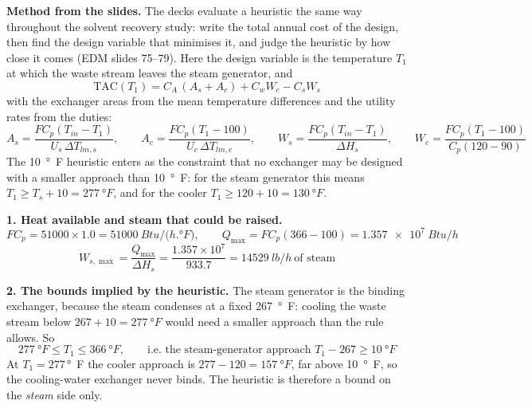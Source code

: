 \documentclass[10pt,a4paper]{article}
\newcommand{\spsub}[1]{\par\addvspace{7pt}\noindent{\color{accent}\bfseries #1}\par\addvspace{3pt}\nopagebreak}
\begin{document}
\begin{mthbox}
\textbf{Method from the slides.} The decks evaluate a heuristic the same way throughout the solvent
recovery study: write the total annual cost of the design, then find the design variable that
minimises it, and judge the heuristic by how close it comes (EDM slides 75--79). Here the design
variable is the temperature $T_1$ at which the waste stream leaves the steam generator, and
\[
\text{TAC}(T_1)=C_A\,(A_s+A_c)+C_wW_c-C_sW_s
\]
with the exchanger areas from the mean temperature differences and the utility rates from the duties:
\[
A_s=\frac{F C_p(T_{in}-T_1)}{U_s\,\Delta T_{lm,s}},\qquad
A_c=\frac{F C_p(T_1-100)}{U_c\,\Delta T_{lm,c}},\qquad
W_s=\frac{F C_p(T_{in}-T_1)}{\Delta H_s},\qquad
W_c=\frac{F C_p(T_1-100)}{C_p(120-90)}
\]
The \SI{10}{\degree F} heuristic enters as the constraint that no exchanger may be designed with a
smaller approach than \SI{10}{\degree F}: for the steam generator this means
$T_1\ge T_s+10=\SI{277}{\degree F}$, and for the cooler $T_1\ge 120+10=\SI{130}{\degree F}$.
\end{mthbox}

\spsub{Solution}
\textbf{1. Heat available and steam that could be raised.}
\[
F C_p=51000\times1.0=\SI{51000}{Btu/(h.\degree F)},\qquad
Q_{\max}=F C_p(366-100)=\SI{1.357e7}{Btu/h}
\]
\[
W_{s,\max}=\frac{Q_{\max}}{\Delta H_s}=\frac{1.357\times10^{7}}{933.7}=\SI{14529}{lb/h}\ \text{of steam}
\]

\textbf{2. The bounds implied by the heuristic.} The steam generator is the binding exchanger,
because the steam condenses at a fixed \SI{267}{\degree F}: cooling the waste stream below
$267+10=\SI{277}{\degree F}$ would need a smaller approach than the rule allows. So
\[
\SI{277}{\degree F}\le T_1\le\SI{366}{\degree F},
\qquad\text{i.e. the steam-generator approach } T_1-267\ge\SI{10}{\degree F}
\]
At $T_1=277$\,\si{\degree F} the cooler approach is $277-120=\SI{157}{\degree F}$, far above
\SI{10}{\degree F}, so the cooling-water exchanger never binds. The heuristic is therefore a bound on
the \emph{steam} side only.
\end{document}
